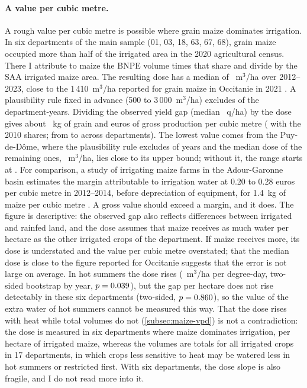 \paragraph{A value per cubic metre.} A rough value per cubic metre is possible where grain maize dominates irrigation. In six departments of the main sample (01, 03, 18, 63, 67, 68), grain maize occupied more than half of the irrigated area in the 2020 agricultural census. There I attribute to maize the BNPE volume times that share and divide by the SAA irrigated maize area. The resulting dose has a median of \WatDose~m$^3$/ha over 2012--2023, close to the 1\,410~m$^3$/ha reported for grain maize in Occitanie in 2021 \parencite{agreste2026occitanie}. A plausibility rule fixed in advance (500 to 3\,000~m$^3$/ha) excludes \WatExcl{} of the \WatN{} department-years. Dividing the observed yield gap (median \WatGain~q/ha) by the dose gives about \WatKg~kg of grain and \WatEur{} euros of gross production per cubic metre (\WatEurTen{} with the 2010 shares; from \WatEurMin{} to \WatEurMax{} across departments). The lowest value comes from the Puy-de-Dôme, where the plausibility rule excludes \WatLowDepExcl{} of \WatLowDepYears{} years and the median dose of the remaining ones, \WatLowDepDose~m$^3$/ha, lies close to its upper bound; without it, the range starts at \WatEurMinOther. For comparison, a study of irrigating maize farms in the Adour-Garonne basin estimates the margin attributable to irrigation water at 0.20 to 0.28 euros per cubic metre in 2012--2014, before depreciation of equipment, for 1.4~kg of maize per cubic metre \parencite{draaf2017}. A gross value should exceed a margin, and it does. The figure is descriptive: the observed gap also reflects differences between irrigated and rainfed land, and the dose assumes that maize receives as much water per hectare as the other irrigated crops of the department. If maize receives more, its dose is understated and the value per cubic metre overstated; that the median dose is close to the figure reported for Occitanie suggests that the error is not large on average. In hot summers the dose rises (\WatDoseSlope~m$^3$/ha per degree-day, two-sided bootstrap by year, $p = 0.039$), but the gap per hectare does not rise detectably in these six departments (two-sided, $p = 0.860$), so the value of the extra water of hot summers cannot be measured this way. That the dose rises with heat while total volumes do not (\cref{subsec:maize-vpd}) is not a contradiction: the dose is measured in six departments where maize dominates irrigation, per hectare of irrigated maize, whereas the volumes are totals for all irrigated crops in 17 departments, in which crops less sensitive to heat may be watered less in hot summers or restricted first. With six departments, the dose slope is also fragile, and I do not read more into it.

